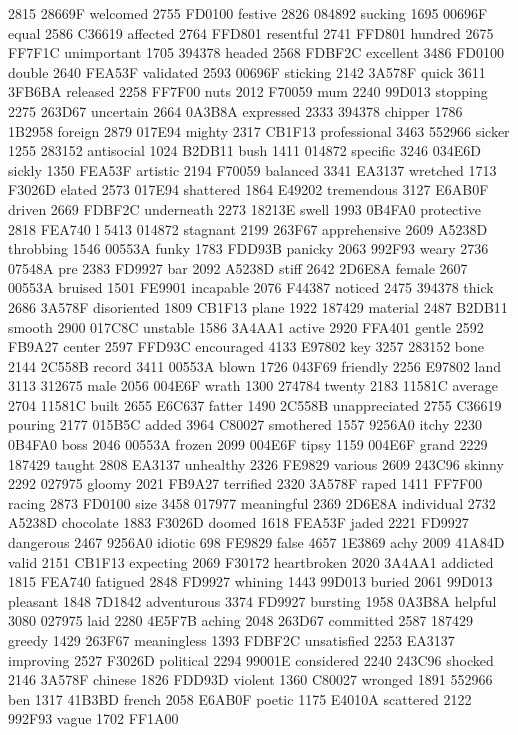 2815 28669F welcomed 2755 FD0100 festive 2826 084892 sucking 1695
00696F equal 2586 C36619 affected 2764 FFD801 resentful 2741 FFD801
hundred 2675 FF7F1C unimportant 1705 394378 headed 2568 FDBF2C
excellent 3486 FD0100 double 2640 FEA53F validated 2593 00696F sticking
2142 3A578F quick 3611 3FB6BA released 2258 FF7F00 nuts 2012 F70059 mum
2240 99D013 stopping 2275 263D67 uncertain 2664 0A3B8A expressed 2333
394378 chipper 1786 1B2958 foreign 2879 017E94 mighty 2317 CB1F13
professional 3463 552966 sicker 1255 283152 antisocial 1024 B2DB11 bush
1411 014872 specific 3246 034E6D sickly 1350 FEA53F artistic 2194
F70059 balanced 3341 EA3137 wretched 1713 F3026D elated 2573 017E94
shattered 1864 E49202 tremendous 3127 E6AB0F driven 2669 FDBF2C
underneath 2273 18213E swell 1993 0B4FA0 protective 2818 FEA740 l 5413
014872 stagnant 2199 263F67 apprehensive 2609 A5238D throbbing 1546
00553A funky 1783 FDD93B panicky 2063 992F93 weary 2736 07548A pre 2383
FD9927 bar 2092 A5238D stiff 2642 2D6E8A female 2607 00553A bruised
1501 FE9901 incapable 2076 F44387 noticed 2475 394378 thick 2686 3A578F
disoriented 1809 CB1F13 plane 1922 187429 material 2487 B2DB11 smooth
2900 017C8C unstable 1586 3A4AA1 active 2920 FFA401 gentle 2592 FB9A27
center 2597 FFD93C encouraged 4133 E97802 key 3257 283152 bone 2144
2C558B record 3411 00553A blown 1726 043F69 friendly 2256 E97802 land
3113 312675 male 2056 004E6F wrath 1300 274784 twenty 2183 11581C
average 2704 11581C built 2655 E6C637 fatter 1490 2C558B unappreciated
2755 C36619 pouring 2177 015B5C added 3964 C80027 smothered 1557 9256A0
itchy 2230 0B4FA0 boss 2046 00553A frozen 2099 004E6F tipsy 1159 004E6F
grand 2229 187429 taught 2808 EA3137 unhealthy 2326 FE9829 various 2609
243C96 skinny 2292 027975 gloomy 2021 FB9A27 terrified 2320 3A578F
raped 1411 FF7F00 racing 2873 FD0100 size 3458 017977 meaningful 2369
2D6E8A individual 2732 A5238D chocolate 1883 F3026D doomed 1618 FEA53F
jaded 2221 FD9927 dangerous 2467 9256A0 idiotic 698 FE9829 false 4657
1E3869 achy 2009 41A84D valid 2151 CB1F13 expecting 2069 F30172
heartbroken 2020 3A4AA1 addicted 1815 FEA740 fatigued 2848 FD9927
whining 1443 99D013 buried 2061 99D013 pleasant 1848 7D1842 adventurous
3374 FD9927 bursting 1958 0A3B8A helpful 3080 027975 laid 2280 4E5F7B
aching 2048 263D67 committed 2587 187429 greedy 1429 263F67 meaningless
1393 FDBF2C unsatisfied 2253 EA3137 improving 2527 F3026D political
2294 99001E considered 2240 243C96 shocked 2146 3A578F chinese 1826
FDD93D violent 1360 C80027 wronged 1891 552966 ben 1317 41B3BD french
2058 E6AB0F poetic 1175 E4010A scattered 2122 992F93 vague 1702 FF1A00
